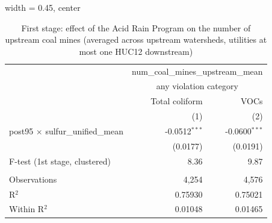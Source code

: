 
\begin{table}[htbp]
   
   \caption{\label{tab:fs_dwnstrm_nonminevio} First stage: effect of the Acid Rain Program on the number of upstream coal mines (averaged across upstream watersheds, utilities at most one HUC12 downstream)}
   \bigskip
   
   \centering
   
   \begin{adjustbox}{width = 0.45\textwidth, center}
      
      
      \begin{tabular}{lrr}
         \toprule
         
          & \multicolumn{2}{c}{num\_coal\_mines\_upstream\_mean}\\
         
          & \multicolumn{2}{c}{any violation category} \\ 
                                                  & Total coliform  & VOCs \\   
         
                                                  & (1)             & (2)\\  
         
         \midrule 
         post95 $\times$ sulfur\_unified\_mean    & -0.0512$^{***}$ & -0.0600$^{***}$\\   
                                                  & (0.0177)        & (0.0191)\\   
         
         F-test (1st stage, clustered)            & 8.36            & 9.87\\  
         
          \\
         
         Observations                             & 4,254           & 4,576\\  
         R$^2$                                    & 0.75930         & 0.75021\\  
         Within R$^2$                             & 0.01048         & 0.01465\\  
         
         \bottomrule
         
      \end{tabular}
      
      

\end{adjustbox}
\end{table}
